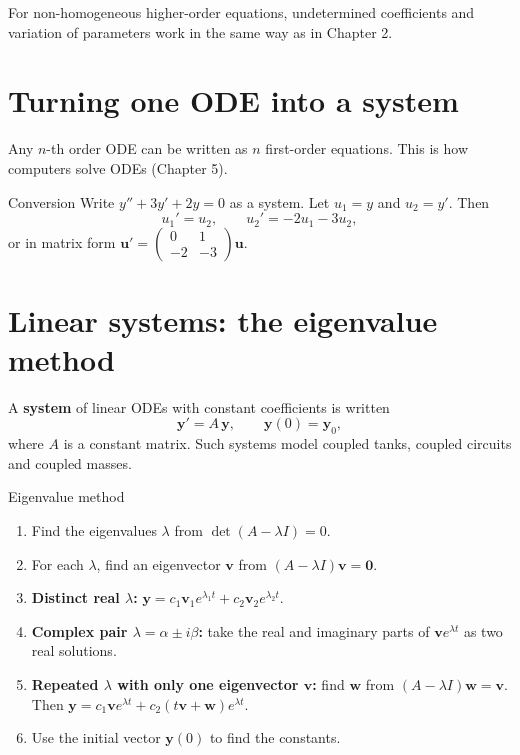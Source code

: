 For non-homogeneous higher-order equations, undetermined coefficients and variation of parameters work in the same way as in Chapter 2.

\section{Turning one ODE into a system}

Any $n$-th order ODE can be written as $n$ first-order equations. This is how computers solve ODEs (Chapter 5).

\begin{examplebox}{Conversion}
Write $y'' + 3y' + 2y = 0$ as a system. Let $u_1 = y$ and $u_2 = y'$. Then
\[ u_1' = u_2, \qquad u_2' = -2u_1 - 3u_2 , \]
or in matrix form $\mathbf{u}' = \begin{pmatrix}0 & 1\\ -2 & -3\end{pmatrix}\mathbf{u}$.
\end{examplebox}

\section{Linear systems: the eigenvalue method}

A \textbf{system} of linear ODEs with constant coefficients is written
\[ \mathbf{y}' = A\,\mathbf{y}, \qquad \mathbf{y}(0) = \mathbf{y}_0 , \]
where $A$ is a constant matrix. Such systems model coupled tanks, coupled circuits and coupled masses.

\begin{methodbox}{Eigenvalue method}
\begin{enumerate}
  \item Find the eigenvalues $\lambda$ from $\det(A - \lambda I) = 0$.
  \item For each $\lambda$, find an eigenvector $\mathbf{v}$ from $(A - \lambda I)\mathbf{v} = \mathbf{0}$.
  \item \textbf{Distinct real $\lambda$:} $\mathbf{y} = c_1\mathbf{v}_1e^{\lambda_1t} + c_2\mathbf{v}_2e^{\lambda_2t}$.
  \item \textbf{Complex pair $\lambda = \alpha \pm i\beta$:} take the real and imaginary parts of $\mathbf{v}e^{\lambda t}$ as two real solutions.
  \item \textbf{Repeated $\lambda$ with only one eigenvector $\mathbf{v}$:} find $\mathbf{w}$ from $(A-\lambda I)\mathbf{w} = \mathbf{v}$. Then $\mathbf{y} = c_1\mathbf{v}e^{\lambda t} + c_2(t\mathbf{v} + \mathbf{w})e^{\lambda t}$.
  \item Use the initial vector $\mathbf{y}(0)$ to find the constants.
\end{enumerate}
\end{methodbox}

